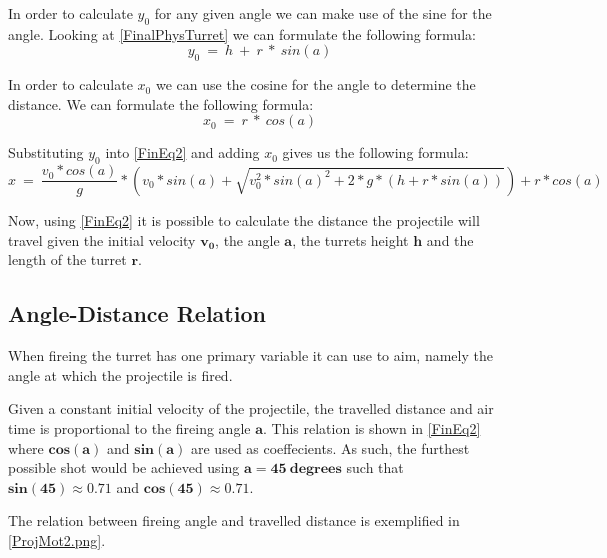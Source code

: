 In order to calculate $y_0$ for any given angle we can make use of the sine for
the angle. Looking at \autoref{FinalPhysTurret} we can formulate the following
formula: 
\begin{equation}\label{Y0Eq}
y_0\ =\ h\ +\ r\ *\ sin(a)
\end{equation}\nl

In order to calculate $x_0$ we can use the cosine for the angle to determine the
distance. We can formulate the following formula:
\begin{equation}\label{Y0Eq}
x_0\ =\ r\ *\ cos(a)
\end{equation}

Substituting $y_0$ into \autoref{FinEq2} and adding $x_0$ gives
us the following formula:
\begin{equation}\label{FinEq2}
x\ =\ \frac{v_0*cos(a)}{g}* \left(
v_0*sin(a)+\sqrt{v_0^2*sin(a)^2+2*g*(h+r*sin(a))}\right)+r*cos(a)
\end{equation}

Now, using \autoref{FinEq2} it is possible to calculate the
distance the projectile will travel given the initial velocity $\mathbf{v_0}$,
the angle $\mathbf{a}$, the turrets height $\mathbf{h}$ and the length of the
turret $\mathbf{r}$.

\subsection{Angle-Distance Relation}
When fireing the turret has one primary variable it can use to aim,
namely the angle at which the projectile is fired.


Given a constant initial velocity of the projectile, the travelled distance and
air time is proportional to the fireing angle $\mathbf{a}$. This relation is
shown in \autoref{FinEq2} where $\mathbf{cos(a)}$ and $\mathbf{sin(a)}$ are used as
coeffecients. As such, the furthest possible shot would be achieved using
$\mathbf{a=45\ degrees}$ such that $\mathbf{sin(45)\approx 0.71}$ and
$\mathbf{cos(45)\approx 0.71}$. 

The relation between fireing angle and travelled distance is exemplified in
\autoref{ProjMot2.png}.


